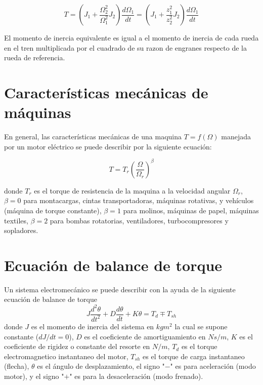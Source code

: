 \documentclass[12pt]{book}
\theoremstyle{definition}
\theoremstyle{remark}
\theoremstyle{plain}
\begin{document}
\begin{equation}
\label{equ109}
T=  (J_1 + \frac{\Omega _2^2}{\Omega _1^2} J_2) \frac{d \Omega _1}{d t}=(J_1 + \frac{z_1^2}{z_2^2} J_2) \frac{d \Omega _1}{d t}
\end{equation}

El momento de inercia equivalente es igual a el momento de inercia de cada rueda en el tren multiplicada por el cuadrado de su razon de engranes respecto de la rueda de referencia.

\section{Características mecánicas de máquinas}

En general, las características mecánicas de una maquina $T= f(\Omega)$ manejada por un motor eléctrico se puede describir por la siguiente ecuación:

\begin{equation}
\label{equ110}
T = T_r \left ( \frac{\Omega}{\Omega _r} \right ) ^\beta
\end{equation}

donde $T_r$ es el torque de resistencia de la maquina a la velocidad angular $\Omega _r$, $\beta =0$  para montacargas, cintas transportadoras, máquinas rotativas, y vehículos (máquina de torque constante), $\beta =1$ para molinos, máquinas de papel, máquinas textiles, $\beta = 2$ para bombas rotatorias, ventiladores, turbocompresores y sopladores.

\section{Ecuación de balance de torque}

Un sistema electromecánico se puede describir con la ayuda de la siguiente ecuación de balance de torque
\begin{equation}
\label{equ111}
J \frac{d ^2 \theta}{d t ^2}+ D \frac{d \theta}{d t}+ K \theta = T_d \mp T_{sh}
\end{equation}
donde $J$ es el momento de inercia del sistema en $kg m^2$ la cual se supone constante ($d J / dt =0$), $D$ es el coeficiente de amortiguamiento en $N s/ m$, $K$ es el coeficiente de rigidez o constante del resorte en $N/m$, $T_d$  es el torque electromagnetico instantaneo del motor, $T_{sh}$ es el torque de carga instantaneo (flecha), $\theta$ es el ángulo de desplazamiento, el signo "$-$" es para aceleración (modo motor), y el signo "$+$" es para la desaceleración (modo frenado).
\end{document}
